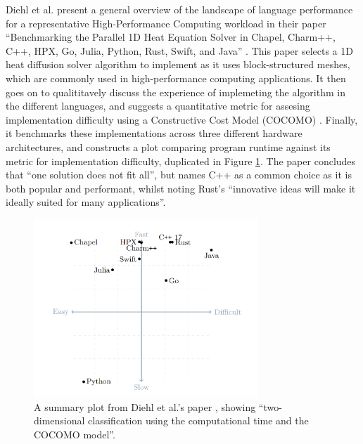 Diehl et al. present a general overview of the landscape of language performance for a representative High-Performance Computing workload in their paper ``Benchmarking the Parallel 1D Heat Equation Solver in Chapel, Charm++, C++, HPX, Go, Julia, Python, Rust, Swift, and Java'' \cite{diehlBenchmarkingParallel1D2023}. This paper selects a 1D heat diffusion solver algorithm to implement as it uses block-structured meshes, which are commonly used in high-performance computing applications. It then goes on to qualititavely discuss the experience of implemeting the algorithm in the different languages, and suggests a quantitative metric for assesing implementation difficulty using a Constructive Cost Model (COCOMO) \cite{}. Finally, it benchmarks these implementations across three different hardware architectures, and constructs a plot comparing program runtime against its metric for implementation difficulty, duplicated in Figure \ref{fig:1d_heat_results}. The paper concludes that ``one solution does not fit all'', but names C++ as a common choice as it is both popular and performant, whilst noting Rust's ``innovative ideas will make it ideally suited for many applications''.

\begin{figure}[H]
    \centering
    \includegraphics[width=0.75\textwidth]{images/2_background/1d_heat_results.png}
    \caption{A summary plot from Diehl et al.'s paper \cite{diehlBenchmarkingParallel1D2023}, showing ``two-dimensional classification using the computational time and the COCOMO model''.}
    \label{fig:1d_heat_results}
\end{figure}

